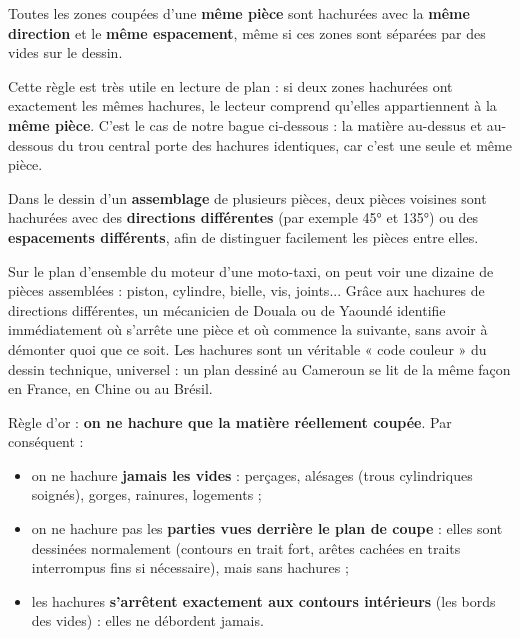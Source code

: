 \documentclass[11pt]{article}
\newcounter{popsec}
\newcounter{popsub}
\newcommand{\courssub}[1]{%
  \stepcounter{popsub}%
  \par\vspace{9pt}\noindent{\popxbold\fontsize{11.5}{13}\selectfont\color{popink}{\color{poporange}\thepopsec.\thepopsub}\hspace{6pt}#1}\par\nopagebreak\vspace{4pt}
}
\begin{document}
\begin{propriete}
Toutes les zones coupées d'une \textbf{même pièce} sont hachurées avec la \textbf{même direction} et le \textbf{même espacement}, même si ces zones sont séparées par des vides sur le dessin.
\end{propriete}

Cette règle est très utile en lecture de plan : si deux zones hachurées ont exactement les mêmes hachures, le lecteur comprend qu'elles appartiennent à la \textbf{même pièce}. C'est le cas de notre bague ci-dessous : la matière au-dessus et au-dessous du trou central porte des hachures identiques, car c'est une seule et même pièce.

\begin{propriete}
Dans le dessin d'un \textbf{assemblage} de plusieurs pièces, deux pièces voisines sont hachurées avec des \textbf{directions différentes} (par exemple \ang{45} et \ang{135}) ou des \textbf{espacements différents}, afin de distinguer facilement les pièces entre elles.
\end{propriete}

\begin{savaistu}
Sur le plan d'ensemble du moteur d'une moto-taxi, on peut voir une dizaine de pièces assemblées : piston, cylindre, bielle, vis, joints... Grâce aux hachures de directions différentes, un mécanicien de Douala ou de Yaoundé identifie immédiatement où s'arrête une pièce et où commence la suivante, sans avoir à démonter quoi que ce soit. Les hachures sont un véritable « code couleur » du dessin technique, universel : un plan dessiné au Cameroun se lit de la même façon en France, en Chine ou au Brésil.
\end{savaistu}

\courssub{Ce que l'on ne hachure pas}

Règle d'or : \textbf{on ne hachure que la matière réellement coupée}. Par conséquent :

\begin{itemize}
\item on ne hachure \textbf{jamais les vides} : perçages, alésages (trous cylindriques soignés), gorges, rainures, logements ;
\item on ne hachure pas les \textbf{parties vues derrière le plan de coupe} : elles sont dessinées normalement (contours en trait fort, arêtes cachées en traits interrompus fins si nécessaire), mais sans hachures ;
\item les hachures \textbf{s'arrêtent exactement aux contours intérieurs} (les bords des vides) : elles ne débordent jamais.
\end{itemize}
\end{document}
